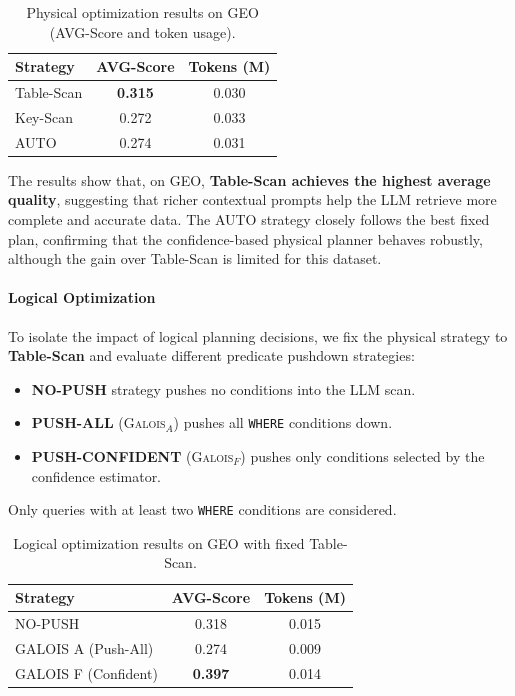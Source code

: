 \begin{table}[H]
    \centering
    \caption{Physical optimization results on GEO (AVG-Score and token usage).}
    \label{tab:exp2-physical}
    \small
    \begin{tabular}{lcc}
        \toprule
        \textbf{Strategy} & \textbf{AVG-Score} & \textbf{Tokens (M)} \\
        \midrule
        Table-Scan & \textbf{0.315} & 0.030 \\
        Key-Scan & 0.272 & 0.033 \\
        AUTO & 0.274 & 0.031 \\
        \bottomrule
    \end{tabular}
\end{table}

The results show that, on GEO, \textbf{Table-Scan achieves the highest average quality}, suggesting that richer contextual prompts help the LLM retrieve more complete and accurate data. The AUTO strategy closely follows the best fixed plan, confirming that the confidence-based physical planner behaves robustly, although the gain over Table-Scan is limited for this dataset.

\paragraph{Logical Optimization}
To isolate the impact of logical planning decisions, we fix the physical strategy to \textbf{Table-Scan} and evaluate different predicate pushdown strategies: 
\begin{itemize}[leftmargin=*,noitemsep]
    \item \textbf{NO-PUSH} strategy pushes no conditions into the LLM scan. 
    \item \textbf{PUSH-ALL} (\textsc{Galois}$_{A}$) pushes all \texttt{WHERE} conditions down. 
    \item \textbf{PUSH-CONFIDENT} (\textsc{Galois}$_{F}$) pushes only conditions selected by the confidence estimator. 
\end{itemize}
Only queries with at least two \texttt{WHERE} conditions are considered.

\begin{table}[H]
    \centering
    \caption{Logical optimization results on GEO with fixed Table-Scan.}
    \label{tab:exp2-logical}
    \small
    \begin{tabular}{lcc}
        \toprule
        \textbf{Strategy} & \textbf{AVG-Score} & \textbf{Tokens (M)} \\
        \midrule
        NO-PUSH & 0.318 & 0.015 \\
        GALOIS A (Push-All) & 0.274 & 0.009 \\
        GALOIS F (Confident) & \textbf{0.397} & 0.014 \\
        \bottomrule
    \end{tabular}
\end{table}

